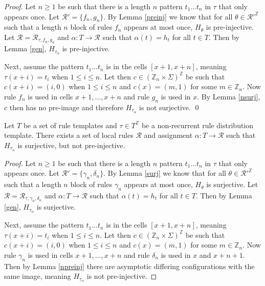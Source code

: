 \documentclass[runningheads]{llncs}
\newcommand{\Z}{\mathbb{Z}}
\begin{document}
\begin{proof}
Let $n \geq 1$ be such that there is a length $n$ pattern $t_1\ldots t_n$ in $\tau$ that only appears once. Let $\mathcal{R}' = \{f_n, g_n\}$. By Lemma \ref{preinj} we know that for all $\theta \in \mathcal{R}'^\Z$ such that a length $n$ block of rules $f_n$ appears at most once, $H_\theta$ is pre-injective. Let $\mathcal{R} = \mathcal{R}_{\tau,f_n,g_n}$ and $\alpha:T\rightarrow \mathcal{R}$ such that $\alpha(t) = h_t$ for all $t \in T$. Then by Lemma \ref{gen}, $H_{\tau_\alpha}$ is pre-injective.

Next, assume the pattern $t_1\ldots t_n$ is in the cells $[x+1,x+n]$, meaning $\tau (x+i) = t_i$ when $1\leq i \leq n$. Let then $c \in (\Z_n \times \Sigma)^\Z$ be such that $c(x+i) = (i, 0)$ when $1\leq i \leq n$ and $c(x) = (m,1)$ for some $m\in \Z_n$. Now rule $f_n$ is used in cells $x+1,\ldots,x+n$ and rule $g_n$ is used in $x$. By Lemma \ref{nsurj}, $c$ then has no pre-image and therefore $H_{\tau_\alpha}$ is not surjective.
\qed
\end{proof}

\begin{theorem}
Let $T$ be a set of rule templates and $\tau \in T^\Z$ be a non-recurrent rule distribution template. There exists a set of local rules $\mathcal{R}$ and assignment $\alpha: T \rightarrow \mathcal{R}$ such that $H_{\tau_\alpha}$ is surjective, but not pre-injective. 
\end{theorem}

\begin{proof}
Let $n \geq 1$ be such that there is a length $n$ pattern $t_1\ldots t_n$ in $\tau$ that only appears once. Let $\mathcal{R}' = \{\gamma_n, \delta_n\}$. By Lemma \ref{surj} we know that for all $\theta \in \mathcal{R}'^\Z$ such that a length $n$ block of rules $\gamma_n$ appears at most once, $H_\theta$ is surjective. Let $\mathcal{R} = \mathcal{R}_{\tau,\gamma_n,\delta_n}$ and $\alpha:T\rightarrow \mathcal{R}$ such that $\alpha(t) = h_t$ for all $t \in T$. Then by Lemma \ref{gen}, $H_{\tau_\alpha}$ is surjective.

Next, assume the pattern $t_1\ldots t_n$ is in the cells $[x+1,x+n]$, meaning $\tau (x+i) = t_i$ when $1\leq i \leq n$. Let then $c \in (\Z_n \times \Sigma)^\Z$ be such that $c(x+i) = (i, 0)$ when $1\leq i \leq n$ and $c(x) = (m,1)$ for some $m\in \Z_n$. Now rule $\gamma_n$ is used in cells $x+1,\ldots,x+n$ and rule $\delta_n$ is used in $x$ and $x+n+1$. Then by Lemma \ref{npreinj} there are asymptotic differing configurations with the same image, meaning $H_{\tau_\alpha}$ is not pre-injective. 
\end{proof}
\end{document}
